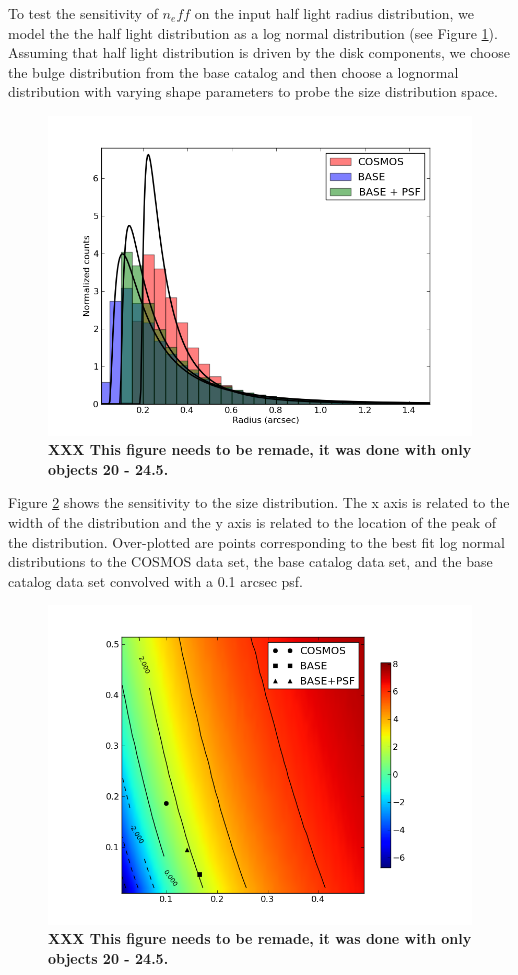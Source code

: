 \documentclass[]{article}
\begin{document}
To test the sensitivity of $n_eff$ on the input half light radius distribution, we model the the half light distribution as a log normal distribution (see Figure
\ref{fig:hl_dist}).  Assuming that half light distribution is driven by the disk components, we choose the bulge distribution from the base catalog and then
choose a lognormal distribution with varying shape parameters to probe the size distribution space.
\begin{figure}
\centering
\includegraphics[width=5in]{validation_figures/ln_fit.png}
\caption{{\bf XXX This figure needs to be remade, it was done with only objects 20 - 24.5.}\label{fig:hl_dist}}
\end{figure}

Figure \ref{fig:size_sens} shows the sensitivity to the size distribution.  The x axis is related to the width of the 
distribution and the y axis is related to the location of the peak of the distribution. Over-plotted are points corresponding
to the best fit log normal distributions to the COSMOS data set, the base catalog data set, and the base catalog data set convolved 
with a 0.1 arcsec psf.
\begin{figure}
\centering
\includegraphics[width=5in]{validation_figures/size_sensitivity.png}
\caption{{\bf XXX This figure needs to be remade, it was done with only objects 20 - 24.5.}\label{fig:size_sens}}
\end{figure}
\end{document}
